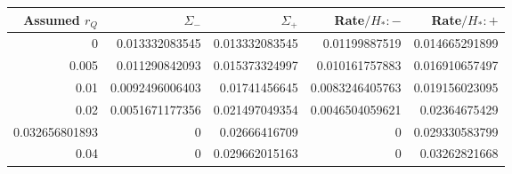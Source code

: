 \begin{tabular}{rrrrr}\hline Assumed $r_Q$ & $\Sigma_-$ & $\Sigma_+$ & Rate$/H_*: -$ & Rate$/H_*: +$\\\hline
0 & 0.013332083545 & 0.013332083545 & 0.01199887519 & 0.014665291899\\
0.005 & 0.011290842093 & 0.015373324997 & 0.010161757883 & 0.016910657497\\
0.01 & 0.0092496006403 & 0.01741456645 & 0.0083246405763 & 0.019156023095\\
0.02 & 0.0051671177356 & 0.021497049354 & 0.0046504059621 & 0.02364675429\\
0.032656801893 & 0 & 0.02666416709 & 0 & 0.029330583799\\
0.04 & 0 & 0.029662015163 & 0 & 0.03262821668\\
\hline\end{tabular}
